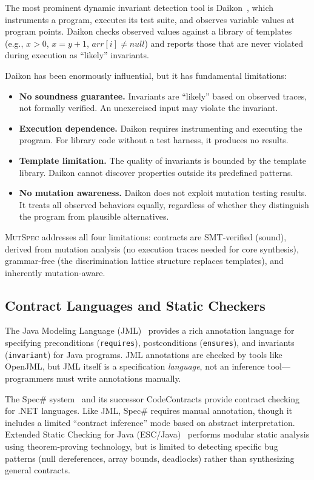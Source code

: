 \documentclass[11pt]{article}
\begin{document}
The most prominent dynamic invariant detection tool is
Daikon~\cite{ernst2007}, which instruments a program, executes its test suite,
and observes variable values at program points. Daikon checks observed values
against a library of templates (e.g., $x > 0$, $x = y + 1$,
$\mathit{arr}[i] \neq \mathit{null}$) and reports those that are never violated
during execution as ``likely'' invariants.

Daikon has been enormously influential, but it has fundamental limitations:
\begin{itemize}[leftmargin=*]
  \item \textbf{No soundness guarantee.} Invariants are ``likely'' based on
    observed traces, not formally verified. An unexercised input may violate
    the invariant.
  \item \textbf{Execution dependence.} Daikon requires instrumenting and
    executing the program. For library code without a test harness, it produces
    no results.
  \item \textbf{Template limitation.} The quality of invariants is bounded by
    the template library. Daikon cannot discover properties outside its
    predefined patterns.
  \item \textbf{No mutation awareness.} Daikon does not exploit mutation
    testing results. It treats all observed behaviors equally, regardless of
    whether they distinguish the program from plausible alternatives.
\end{itemize}

\textsc{MutSpec} addresses all four limitations: contracts are SMT-verified
(sound), derived from mutation analysis (no execution traces needed for core
synthesis), grammar-free (the discrimination lattice structure replaces
templates), and inherently mutation-aware.

\subsection{Contract Languages and Static Checkers}
\label{sec:contracts}

The Java Modeling Language (JML)~\cite{leavens2006} provides a rich annotation
language for specifying preconditions (\texttt{requires}), postconditions
(\texttt{ensures}), and invariants (\texttt{invariant}) for Java programs. JML
annotations are checked by tools like OpenJML, but JML itself is a specification
\emph{language}, not an inference tool---programmers must write annotations
manually.

The Spec\# system~\cite{barnett2005} and its successor
CodeContracts provide contract checking for .NET languages. Like JML, Spec\#
requires manual annotation, though it includes a limited ``contract inference''
mode based on abstract interpretation. Extended Static Checking for Java
(ESC/Java)~\cite{flanagan2002} performs modular static analysis using
theorem-proving technology, but is limited to detecting specific bug patterns
(null dereferences, array bounds, deadlocks) rather than synthesizing general
contracts.
\end{document}
